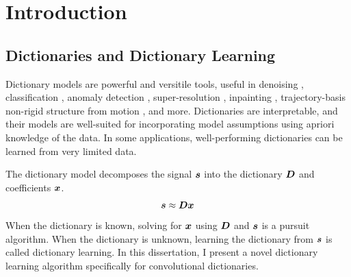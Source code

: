 \chapter{Introduction}


\section{Dictionaries and Dictionary Learning}
Dictionary models are powerful and versitile tools, useful in denoising \cite{wohlberg2016convolutional}, classification \cite{kong2012dictionary}, anomaly detection \cite{carroll2017outlier}, super-resolution \cite{polatkan2014bayesian}\cite{gu2015convolutional}, inpainting \cite{papyan2017convolutional}, trajectory-basis non-rigid structure from motion \cite{zhu2013convolutional}\cite{chodosh2020use}, and more. Dictionaries are interpretable, and their models are well-suited for incorporating model assumptions using apriori knowledge of the data. In some applications, well-performing dictionaries can be learned from very limited data.

The dictionary model decomposes the signal $\bm{s}$ into the dictionary $\bm{D}$ and coefficients $\bm{x}$.
%
\begin{equation}
\bm{s} \approx \bm{D}\bm{x}
\end{equation}
%
When the dictionary is known, solving for $\bm{x}$ using $\bm{D}$ and $\bm{s}$ is a pursuit algorithm. When the dictionary is unknown, learning the dictionary from $\bm{s}$ is called dictionary learning. In this dissertation, I present a novel dictionary learning algorithm specifically for convolutional dictionaries.

